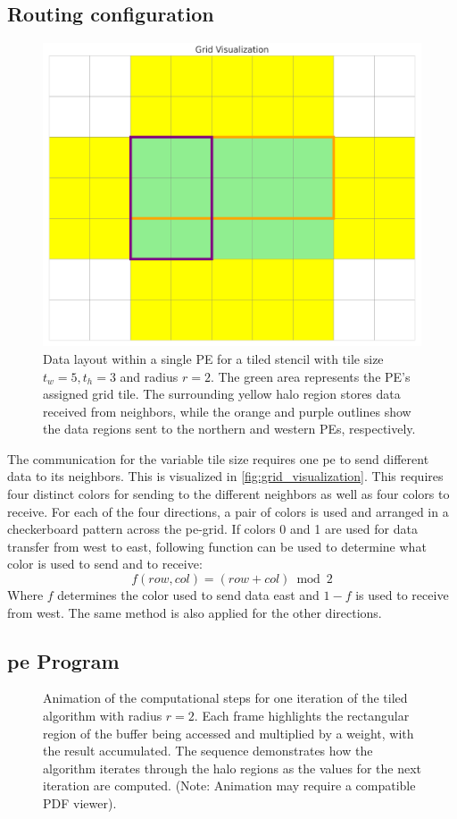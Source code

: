 \subsection{Routing configuration}
\begin{figure}
    \centering
    \includegraphics[width=0.5\linewidth]{grid_visualization.png}
    \caption{Data layout within a single PE for a tiled stencil with tile size $t_w=5, t_h=3$ and radius $r=2$. The green area represents the PE's assigned grid tile. The surrounding yellow halo region stores data received from neighbors, while the orange and purple outlines show the data regions sent to the northern and western PEs, respectively.}
    \label{fig:grid_visualization}
\end{figure}
The communication for the variable tile size requires one \ac{pe} to send different data to its neighbors. This is visualized in \autoref{fig:grid_visualization}. This requires four distinct colors for sending to the different neighbors as well as four colors to receive. For each of the four directions, a pair of colors is used and arranged in a checkerboard pattern across the \ac{pe}-grid.
If colors 0 and 1 are used for data transfer from west to east, following function can be used to determine what color is used to send and to receive:
\begin{equation}
    \label{eq:tiled_coloring_function}
    f(row, col)=(row+col) \bmod 2
\end{equation}
Where $f$ determines the color used to send data east and $1-f$ is used to receive from west. The same method is also applied for the other directions.

\subsection{\ac{pe} Program}

\begin{figure}
    \centering
    \caption{Animation of the computational steps for one iteration of the tiled algorithm with radius $r=2$. Each frame highlights the rectangular region of the buffer being accessed and multiplied by a weight, with the result accumulated. The sequence demonstrates how the algorithm iterates through the halo regions as the values for the next iteration are computed. (Note: Animation may require a compatible PDF viewer).}
    \label{fig:stencil_algorithm_animation}
\end{figure}

